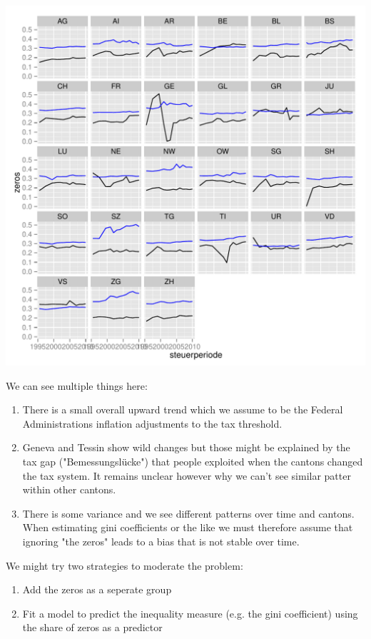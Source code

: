 \documentclass[twoside]{article}\usepackage[]{graphicx}\usepackage[]{color}
\makeatletter
\def\maxwidth{ %
  \ifdim\Gin@nat@width>\linewidth
    \linewidth
  \else
    \Gin@nat@width
  \fi
}
\newenvironment{knitrout}{}{} %
\makeatother
\begin{document}
\begin{multicols}{2}
\begin{knitrout}
\includegraphics[width=\maxwidth]{figure/zero_descriptives2} 

\end{knitrout}


We can see multiple things here:

\begin{enumerate}
\item There is a small overall upward trend which we assume to be the Federal Administrations inflation adjustments to the tax threshold.
\item Geneva and Tessin show wild changes but those might be explained by the tax gap ("Bemessungslücke") that people exploited when the cantons changed the tax system. It remains unclear however why we can't see similar patter within other cantons.
\item There is some variance and we see different patterns over time and cantons. When estimating gini coefficients or the like we must therefore assume that ignoring "the zeros" leads to a bias that is not stable over time.
\end{enumerate}

We might try two strategies to moderate the problem:

\begin{enumerate}
\item Add the zeros as a seperate group
\item Fit a model to predict the inequality measure (e.g. the gini coefficient) using the share of zeros as a predictor
\end{enumerate}


\end{multicols}
\end{document}
